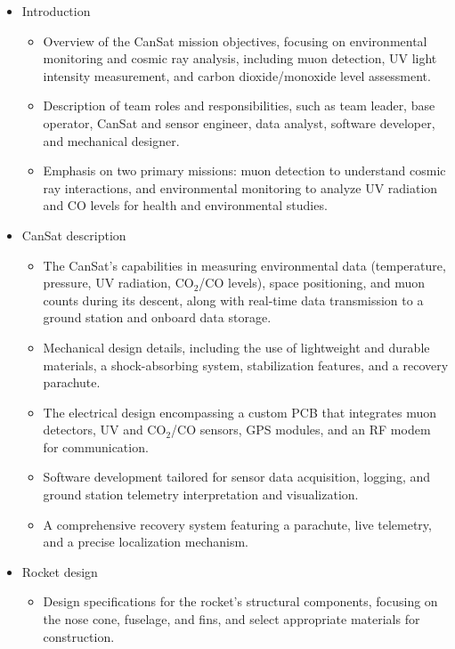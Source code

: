 \begin{itemize}[leftmargin=1cm, itemindent=0.25cm, noitemsep, topsep=0pt, label=$\bullet$]
\item[I.] Introduction
\begin{itemize}[label=$\bullet$, noitemsep, topsep=2pt]
\item Overview of the CanSat mission objectives, focusing on environmental monitoring and cosmic ray analysis, including muon detection, UV light intensity measurement, and carbon dioxide/monoxide level assessment.
\item Description of team roles and responsibilities, such as team leader, base operator, CanSat and sensor engineer, data analyst, software developer, and mechanical designer.
\item Emphasis on two primary missions: muon detection to understand cosmic ray interactions, and environmental monitoring to analyze UV radiation and CO levels for health and environmental studies.
\end{itemize}
\item[II.] CanSat description
\begin{itemize}[label=$\bullet$, noitemsep, topsep=2pt]
\item The CanSat's capabilities in measuring environmental data (temperature, pressure, UV radiation, CO$_2$/CO levels), space positioning, and muon counts during its descent, along with real-time data transmission to a ground station and onboard data storage.
\item Mechanical design details, including the use of lightweight and durable materials, a shock-absorbing system, stabilization features, and a recovery parachute.
\item The electrical design encompassing a custom PCB that integrates muon detectors, UV and CO$_2$/CO sensors, GPS modules, and an RF modem for communication.
\item Software development tailored for sensor data acquisition, logging, and ground station telemetry interpretation and visualization.
\item A comprehensive recovery system featuring a parachute, live telemetry, and a precise localization mechanism.
\end{itemize}
\item[III.] Rocket design
\begin{itemize}[label=$\bullet$, noitemsep, topsep=2pt]
\item Design specifications for the rocket's structural components, focusing on the nose cone, fuselage, and fins, and select appropriate materials for construction.

\end{itemize}
\end{itemize}

